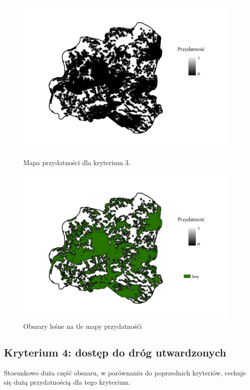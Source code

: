 \documentclass{article}
\begin{document}
\begin{figure}[H]
    \begin{minipage}[t]{0.48\textwidth}
        \centering
        \includegraphics[width=\linewidth]{img/plesna-kryterium3-layout.jpg}
        \caption{Mapa przydatności dla kryterium 3.}
        \label{fig:kryterium3-layout}
    \end{minipage}
    \hfill
    \begin{minipage}[t]{0.48\textwidth}
        \centering
        \includegraphics[width=\linewidth]{img/plesna-kryterium3-lasy.jpg}
        \caption{Obszary leśne na tle mapy przydatnośći}
        \label{fig:kryterium3-lasy}
    \end{minipage}
\end{figure}
\newpage

\subsection{Kryterium 4: dostęp do dróg utwardzonych}
Stosunkowo duża część obszaru, w porównaniu do poprzednich kryteriów, cechuje się dużą przydatnością dla tego kryterium.
\end{document}
